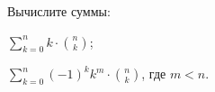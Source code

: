 Вычислите суммы:
\begin{enumcyr}
    \item $\sum\limits_{k = 0}^n k \cdot \binom{n}{k}$;
    \item $\sum\limits_{k = 0}^n (-1)^{k}k^{m} \cdot \binom{n}{k}$, где $m < n$.
\end{enumcyr}